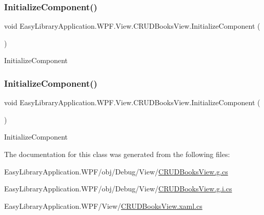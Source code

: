 \subsubsection{\texorpdfstring{Initialize\+Component()}{InitializeComponent()}\hspace{0.1cm}{\footnotesize\ttfamily [1/2]}}
{\footnotesize\ttfamily void Easy\+Library\+Application.\+W\+P\+F.\+View.\+C\+R\+U\+D\+Books\+View.\+Initialize\+Component (\begin{DoxyParamCaption}{ }\end{DoxyParamCaption})}



Initialize\+Component 

\mbox{\label{class_easy_library_application_1_1_w_p_f_1_1_view_1_1_c_r_u_d_books_view_a90f294791c1a951399e01b50016e5b48}} 
\subsubsection{\texorpdfstring{Initialize\+Component()}{InitializeComponent()}\hspace{0.1cm}{\footnotesize\ttfamily [2/2]}}
{\footnotesize\ttfamily void Easy\+Library\+Application.\+W\+P\+F.\+View.\+C\+R\+U\+D\+Books\+View.\+Initialize\+Component (\begin{DoxyParamCaption}{ }\end{DoxyParamCaption})}



Initialize\+Component 



The documentation for this class was generated from the following files\+:\begin{DoxyCompactItemize}
\item 
Easy\+Library\+Application.\+W\+P\+F/obj/\+Debug/\+View/\mbox{\hyperlink{_c_r_u_d_books_view_8g_8cs}{C\+R\+U\+D\+Books\+View.\+g.\+cs}}\item 
Easy\+Library\+Application.\+W\+P\+F/obj/\+Debug/\+View/\mbox{\hyperlink{_c_r_u_d_books_view_8g_8i_8cs}{C\+R\+U\+D\+Books\+View.\+g.\+i.\+cs}}\item 
Easy\+Library\+Application.\+W\+P\+F/\+View/\mbox{\hyperlink{_c_r_u_d_books_view_8xaml_8cs}{C\+R\+U\+D\+Books\+View.\+xaml.\+cs}}\end{DoxyCompactItemize}
